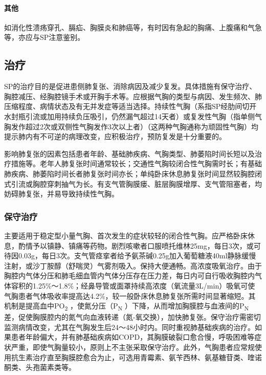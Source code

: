 \paragraph{其他}

如消化性溃疡穿孔、膈疝、胸膜炎和肺癌等，有时因有急起的胸痛、上腹痛和气急等，亦应与SP注意鉴别。

\subsection{治疗}

SP的治疗目的是促进患侧肺复张、消除病因及减少复发。具体措施有保守治疗、胸腔减压、经胸腔镜手术或开胸手术等。应根据气胸的类型与病因、发生频次、肺压缩程度、病情状态及有无并发症等适当选择。持续性气胸（系指SP经肋间切开水封瓶引流或加用持续负压吸引，仍然漏气超过14天者）或复发性气胸（指单侧气胸发作超过2次或双侧性气胸发作3次以上者）（这两种气胸通称为顽固性气胸）均提示肺内有不可逆的病理改变，应积极治疗，预防复发是十分重要的。

影响肺复张的因素包括患者年龄、基础肺疾病、气胸类型、肺萎陷时间长短以及治疗措施等。老年人肺复张时间通常较长；交通性气胸较闭合性气胸需时长；有基础肺疾病、肺萎陷时间长者肺复张时间亦长；单纯卧床休息肺复张时间显然较胸腔闭式引流或胸腔穿刺抽气为长。有支气管胸膜瘘、脏层胸膜增厚、支气管阻塞者，均妨碍肺复张，并易导致持续性气胸。

\subsubsection{保守治疗}

主要适用于稳定型小量气胸、首次发生的症状较轻的闭合性气胸。应严格卧床休息，酌情予以镇静、镇痛等药物。剧烈咳嗽者口服喷托维林25mg，每日3次，或可待因0.03g，每日3次。支气管痉挛者给予氨茶碱0.25g加入葡萄糖液40ml静脉缓慢注射，或沙丁胺醇（舒喘灵）气雾剂吸入。保持大便通畅。高浓度吸氧治疗。由于胸腔内气体分压和肺毛细血管内气体分压存在压力差，每日内可自行吸收胸腔内气体容积的1.25\%～1.8\%；经鼻导管或面罩持续高浓度（氧流量3L/min）吸氧可使气胸患者气体吸收率提高达4.2\%，较一般卧床休息肺复张所需时间显著缩短。其机制是提高血中PO\textsubscript{2}
，使氮分压（P\textsubscript{N}
）下降，从而增加胸膜腔与血液间的P\textsubscript{N}
差，促使胸膜腔内的氮气向血液转递（氮-氧交换），加快肺复张。保守治疗需密切监测病情改变，尤其在气胸发生后24～48小时内。同时重视肺基础疾病的治疗。如果患者年龄偏大，并有肺基础疾病如COPD，其胸膜破裂口愈合慢，呼吸困难等症状严重，即使气胸量较小，原则上不主张采取保守治疗。此外，气胸患者应常规使用抗生素治疗直至胸膜腔愈合为止，可选用青霉素、氨苄西林、氨基糖苷类、喹诺酮类、头孢菌素类等。


